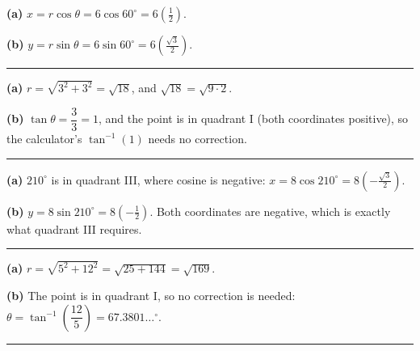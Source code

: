 \documentclass[12pt]{article}
\begin{document}



\textbf{(a)} $x = r\cos\theta = 6\cos 60^\circ = 6\left(\tfrac{1}{2}\right)$. 

\textbf{(b)} $y = r\sin\theta = 6\sin 60^\circ = 6\left(\tfrac{\sqrt{3}}{2}\right)$. 

\vspace{0.12cm}\noindent\rule{\linewidth}{0.2pt}\vspace{0.12cm}


\textbf{(a)} $r = \sqrt{3^2 + 3^2} = \sqrt{18}$, and $\sqrt{18} = \sqrt{9 \cdot 2}$. 

\textbf{(b)} $\tan\theta = \dfrac{3}{3} = 1$, and the point is in quadrant I (both coordinates positive), so the calculator's $\tan^{-1}(1)$ needs no correction. 

\vspace{0.12cm}\noindent\rule{\linewidth}{0.2pt}\vspace{0.12cm}


\textbf{(a)} $210^\circ$ is in quadrant III, where cosine is negative: $x = 8\cos 210^\circ = 8\left(-\tfrac{\sqrt{3}}{2}\right)$. 

\textbf{(b)} $y = 8\sin 210^\circ = 8\left(-\tfrac{1}{2}\right)$. Both coordinates are negative, which is exactly what quadrant III requires. 

\vspace{0.12cm}\noindent\rule{\linewidth}{0.2pt}\vspace{0.12cm}


\textbf{(a)} $r = \sqrt{5^2 + 12^2} = \sqrt{25 + 144} = \sqrt{169}$. 

\textbf{(b)} The point is in quadrant I, so no correction is needed:
$\theta = \tan^{-1}\!\left(\dfrac{12}{5}\right) = 67.3801\ldots^\circ$. 

\vspace{0.12cm}\noindent\rule{\linewidth}{0.2pt}\vspace{0.12cm}
\end{document}
